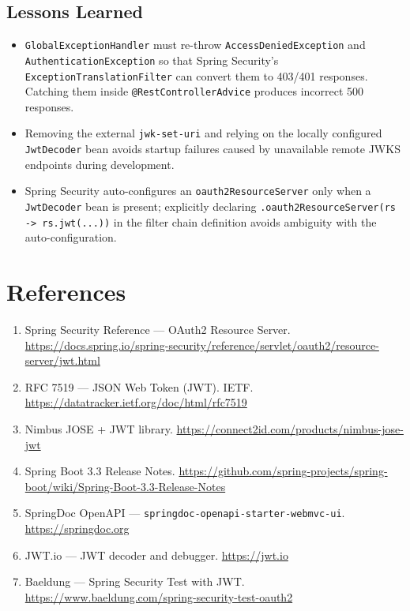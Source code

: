 \documentclass[10pt,a4paper,twocolumn]{article}
\begin{document}
\subsection{Lessons Learned}

\begin{itemize}
  \item \texttt{GlobalExceptionHandler} must re-throw
        \texttt{AccessDeniedException} and \texttt{AuthenticationException}
        so that Spring Security's \texttt{ExceptionTranslationFilter} can
        convert them to 403/401 responses. Catching them inside
        \texttt{@RestControllerAdvice} produces incorrect 500 responses.
  \item Removing the external \texttt{jwk-set-uri} and relying on the
        locally configured \texttt{JwtDecoder} bean avoids startup failures
        caused by unavailable remote JWKS endpoints during development.
  \item Spring Security auto-configures an \texttt{oauth2ResourceServer}
        only when a \texttt{JwtDecoder} bean is present; explicitly declaring
        \texttt{.oauth2ResourceServer(rs -> rs.jwt(...))} in the filter chain
        definition avoids ambiguity with the auto-configuration.
\end{itemize}

\section{References}

\begin{enumerate}
  \item Spring Security Reference --- OAuth2 Resource Server.
        \url{https://docs.spring.io/spring-security/reference/servlet/oauth2/resource-server/jwt.html}

  \item RFC 7519 --- JSON Web Token (JWT). IETF.
        \url{https://datatracker.ietf.org/doc/html/rfc7519}

  \item Nimbus JOSE + JWT library.
        \url{https://connect2id.com/products/nimbus-jose-jwt}

  \item Spring Boot 3.3 Release Notes.
        \url{https://github.com/spring-projects/spring-boot/wiki/Spring-Boot-3.3-Release-Notes}

  \item SpringDoc OpenAPI --- \texttt{springdoc-openapi-starter-webmvc-ui}.
        \url{https://springdoc.org}

  \item JWT.io --- JWT decoder and debugger.
        \url{https://jwt.io}

  \item Baeldung --- Spring Security Test with JWT.
        \url{https://www.baeldung.com/spring-security-test-oauth2}
\end{enumerate}
\end{document}
